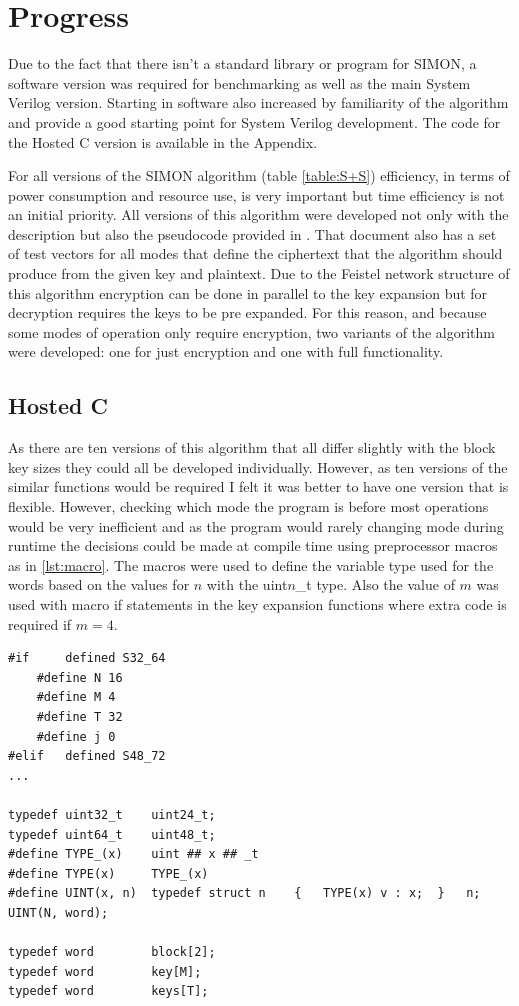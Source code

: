 \documentclass[12pt,twoside,a4paper]{report}
\begin{document}
    \chapter{Progress}  
    Due to the fact that there isn't a standard library or program for SIMON, a software version was required for benchmarking as well as the main System Verilog version. Starting in software also increased by familiarity of the algorithm and provide a good starting point for System Verilog development. The code for the Hosted C version is available in the Appendix. 
    
    For all versions of the SIMON algorithm (table \ref{table:S+S}) efficiency, in terms of power consumption and resource use, is very important but time efficiency is not an initial priority. All versions of this algorithm were developed not only with the description but also the pseudocode provided in \cite{Beaulieu2013}. That document also has a set of test vectors for all modes that define the ciphertext that the algorithm should produce from the given key and plaintext. Due to the Feistel network structure of this algorithm encryption can be done in parallel to the key expansion but for decryption requires the keys to be pre expanded. For this reason, and because some modes of operation only require encryption, two variants of the algorithm were developed: one for just encryption and one with full functionality.
    
    \section{Hosted C}
    \label{section:C}
    As there are ten versions of this algorithm that all differ slightly with the block key sizes they could all be developed individually. However, as ten versions of the similar functions would be required I felt it was better to have one version that is flexible. However, checking which mode the program is before most operations would be very inefficient and as the program would rarely changing mode during runtime the decisions could be made at compile time using preprocessor macros as in \autoref{lst:macro}. The macros were used to define the variable type used for the words based on the values for $n$ with the uint$n$\_t type. Also the value of $m$ was used with macro if statements in the key expansion functions where extra code is required if $m = 4$.
    
    \pagebreak
    \begin{lstlisting}[label={lst:macro},caption={Macro definition of word type},style=CStyle]
#if		defined	S32_64
	#define N 16
	#define M 4
	#define T 32
	#define	j 0
#elif	defined S48_72
...

typedef uint32_t	uint24_t;
typedef uint64_t	uint48_t;
#define TYPE_(x)	uint ## x ## _t
#define TYPE(x)		TYPE_(x)
#define UINT(x, n)	typedef struct n	{	TYPE(x) v : x;	}	n;
UINT(N, word);

typedef word 		block[2];
typedef word 		key[M];
typedef word		keys[T];\end{lstlisting}
\end{document}
